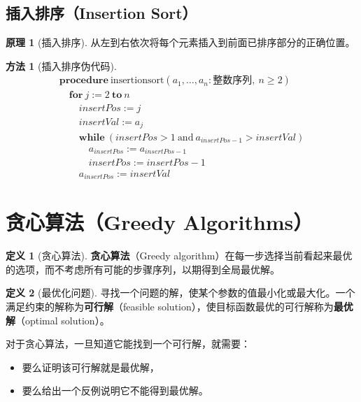 \documentclass[UTF8,11pt,a4paper]{ctexbook}   %
\theoremstyle{definition}
\newtheorem{definition}{定义}[section]
\newtheorem{principle}{原理}[section]
\newtheorem{method}{方法}[section]
\begin{document}
\subsection{插入排序（Insertion Sort）}

\begin{principle}[插入排序]
从左到右依次将每个元素插入到前面已排序部分的正确位置。
\end{principle}

\begin{method}[插入排序伪代码]
\[
\begin{array}{l}
\textbf{procedure}\ \text{insertionsort}(a_1, \ldots, a_n: \text{整数序列},\ n \geq 2)\\
\quad \textbf{for}\ j := 2\ \textbf{to}\ n\\
\quad \quad insertPos := j\\
\quad \quad insertVal := a_j\\
\quad \quad \textbf{while}\ (insertPos > 1\ \text{and}\ a_{insertPos-1} > insertVal)\\
\quad \quad \quad a_{insertPos} := a_{insertPos-1}\\
\quad \quad \quad insertPos := insertPos - 1\\
\quad \quad a_{insertPos} := insertVal
\end{array}
\]
\end{method}

\section{贪心算法（Greedy Algorithms）}

\begin{definition}[贪心算法]
\textbf{贪心算法}（Greedy algorithm）在每一步选择当前看起来最优的选项，而不考虑所有可能的步骤序列，以期得到全局最优解。
\end{definition}

\begin{definition}[最优化问题]
寻找一个问题的解，使某个参数的值最小化或最大化。一个满足约束的解称为\textbf{可行解}（feasible solution），使目标函数最优的可行解称为\textbf{最优解}（optimal solution）。
\end{definition}

对于贪心算法，一旦知道它能找到一个可行解，就需要：
\begin{itemize}
    \item 要么证明该可行解就是最优解，
    \item 要么给出一个反例说明它不能得到最优解。
\end{itemize}
\end{document}
